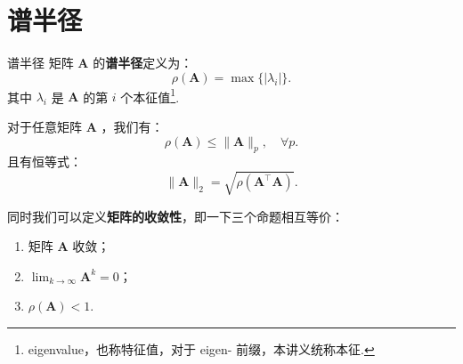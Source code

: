 \section{谱半径}
\begin{definition}{谱半径}
    矩阵 $\mathbf{A}$ 的{\bf 谱半径}定义为：
    \[
        \rho(\mathbf{A}) = \max\{|\lambda_i|\}.
    \]
    其中 $\lambda_i$ 是 $\mathbf{A}$ 的第 $i$ 个本征值\footnote{eigenvalue，也称特征值，对于 eigen- 前缀，本讲义统称本征.}.
\end{definition}
对于任意矩阵 $\mathbf{A}$ ，我们有：
\[
    \rho(\mathbf{A}) \leqslant \|\mathbf{A}\|_p,\quad \forall p.
\]
且有恒等式：
\[
    \|  \mathbf{A}\|_2 = \sqrt{\rho(\mathbf{A}^\top\mathbf{A})}.
\]

同时我们可以定义{\bf 矩阵的收敛性}，即一下三个命题相互等价：
\begin{enumerate}
    \item 矩阵 $\mathbf{A}$ 收敛；
    \item $\lim_{k\to \infty} \mathbf{A}^k = 0$；
    \item $\rho(\mathbf{A})<1$.
\end{enumerate}

